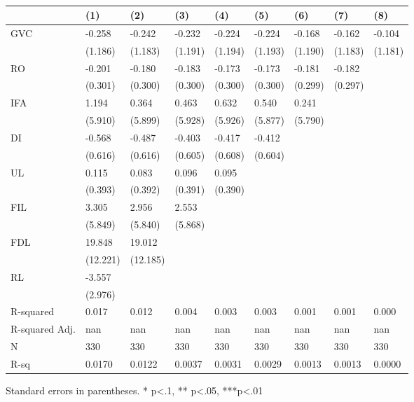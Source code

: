 \begin{table}
\caption{}
\label{}
\begin{center}
\begin{tabular}{lllllllll}
\hline
               & (1)      & (2)      & (3)     & (4)     & (5)     & (6)     & (7)     & (8)      \\
\hline
GVC            & -0.258   & -0.242   & -0.232  & -0.224  & -0.224  & -0.168  & -0.162  & -0.104   \\
               & (1.186)  & (1.183)  & (1.191) & (1.194) & (1.193) & (1.190) & (1.183) & (1.181)  \\
RO             & -0.201   & -0.180   & -0.183  & -0.173  & -0.173  & -0.181  & -0.182  &          \\
               & (0.301)  & (0.300)  & (0.300) & (0.300) & (0.300) & (0.299) & (0.297) &          \\
IFA            & 1.194    & 0.364    & 0.463   & 0.632   & 0.540   & 0.241   &         &          \\
               & (5.910)  & (5.899)  & (5.928) & (5.926) & (5.877) & (5.790) &         &          \\
DI             & -0.568   & -0.487   & -0.403  & -0.417  & -0.412  &         &         &          \\
               & (0.616)  & (0.616)  & (0.605) & (0.608) & (0.604) &         &         &          \\
UL             & 0.115    & 0.083    & 0.096   & 0.095   &         &         &         &          \\
               & (0.393)  & (0.392)  & (0.391) & (0.390) &         &         &         &          \\
FIL            & 3.305    & 2.956    & 2.553   &         &         &         &         &          \\
               & (5.849)  & (5.840)  & (5.868) &         &         &         &         &          \\
FDL            & 19.848   & 19.012   &         &         &         &         &         &          \\
               & (12.221) & (12.185) &         &         &         &         &         &          \\
RL             & -3.557   &          &         &         &         &         &         &          \\
               & (2.976)  &          &         &         &         &         &         &          \\
R-squared      & 0.017    & 0.012    & 0.004   & 0.003   & 0.003   & 0.001   & 0.001   & 0.000    \\
R-squared Adj. & nan      & nan      & nan     & nan     & nan     & nan     & nan     & nan      \\
N              & 330      & 330      & 330     & 330     & 330     & 330     & 330     & 330      \\
R-sq           & 0.0170   & 0.0122   & 0.0037  & 0.0031  & 0.0029  & 0.0013  & 0.0013  & 0.0000   \\
\hline
\end{tabular}
\end{center}
\end{table}
\bigskip
Standard errors in parentheses. \newline 
* p<.1, ** p<.05, ***p<.01